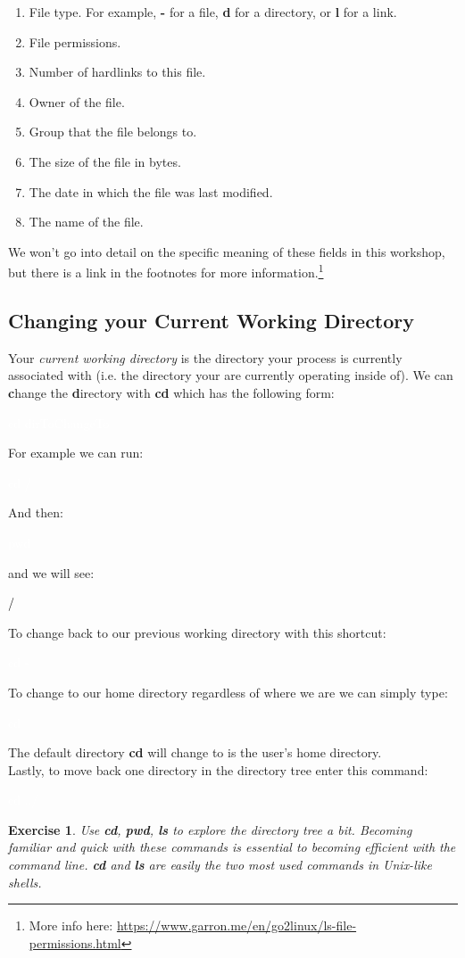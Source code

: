 \documentclass[oneside]{book}
\newcommand{\commandline}[1]{\begin{center} \colorbox{Dark}{\textcolor{white}{#1}} \end{center}}
\newcommand{\exampleout}[1]{\begin{center} \colorbox{Light}{\textcolor{black}{#1}} \end{center}}
\newtheorem{ex}{Exercise}[chapter]
\begin{document}
\begin{enumerate}
    \item File type. For example, \textbf{-} for a file, \textbf{d} for a directory, or \textbf{l} for a link.
    \item File permissions. 
    \item Number of hardlinks to this file.
    \item Owner of the file.
    \item Group that the file belongs to.
    \item The size of the file in bytes.
    \item The date in which the file was last modified.
    \item The name of the file.
\end{enumerate}

We won't go into detail on the specific meaning of these fields in this workshop, but there is a link in the footnotes for more information.\footnote{More info here: \url{https://www.garron.me/en/go2linux/ls-file-permissions.html}}
	
\subsection{Changing your Current Working Directory}
 Your \textit{current working directory} is the directory your process is currently associated with (i.e. the directory your are currently operating inside of). We can \textbf{c}hange the \textbf{d}irectory with \textbf{cd} which has the following form:

\commandline{cd dirToChangeTo}
For example we can run:
\commandline{cd /}
And then:
\commandline{pwd}
and we will see:
\exampleout{/}
To change back to our previous working directory with this shortcut:
\commandline{cd -}
To change to our home directory regardless of where we are we can simply type:
\commandline{cd}
The default directory \textbf{cd} will change to is the user's home directory. \\
Lastly, to move back one directory in the directory tree enter this command:
\commandline{cd ../}

\begin{ex}
	Use \textbf{cd}, \textbf{pwd}, \textbf{ls} to explore the directory tree a bit. Becoming familiar and quick with these commands is essential to becoming efficient with the command line. \textbf{cd} and \textbf{ls} are easily the two most used commands in Unix-like shells.
\end{ex}
\end{document}

